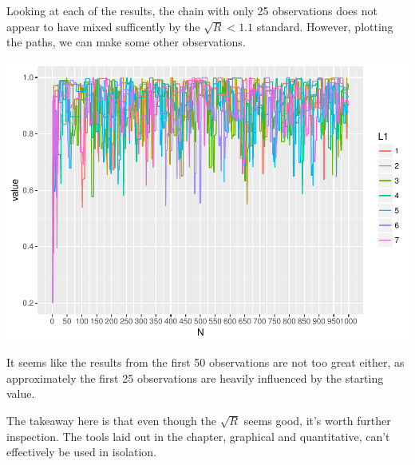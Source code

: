 \documentclass[]{article}
\newenvironment{Shaded}{\begin{snugshade}}{\end{snugshade}}
\newcommand{\KeywordTok}[1]{\textcolor[rgb]{0.13,0.29,0.53}{\textbf{{#1}}}}
\newcommand{\DataTypeTok}[1]{\textcolor[rgb]{0.13,0.29,0.53}{{#1}}}
\newcommand{\DecValTok}[1]{\textcolor[rgb]{0.00,0.00,0.81}{{#1}}}
\newcommand{\StringTok}[1]{\textcolor[rgb]{0.31,0.60,0.02}{{#1}}}
\newcommand{\NormalTok}[1]{{#1}}
\begin{document}
Looking at each of the results, the chain with only 25 observations does
not appear to have mixed sufficently by the \(\sqrt{R} < 1.1\) standard.
However, plotting the paths, we can make some other observations.

\begin{Shaded}
\end{Shaded}

\includegraphics{Atlas-PS_6_files/figure-latex/unnamed-chunk-14-1.pdf}

It seems like the results from the first 50 observations are not too
great either, as approximately the first 25 observations are heavily
influenced by the starting value.

The takeaway here is that even though the \(\sqrt{R}\) seems good, it's
worth further inspection. The tools laid out in the chapter, graphical
and quantitative, can't effectively be used in isolation.
\end{document}
